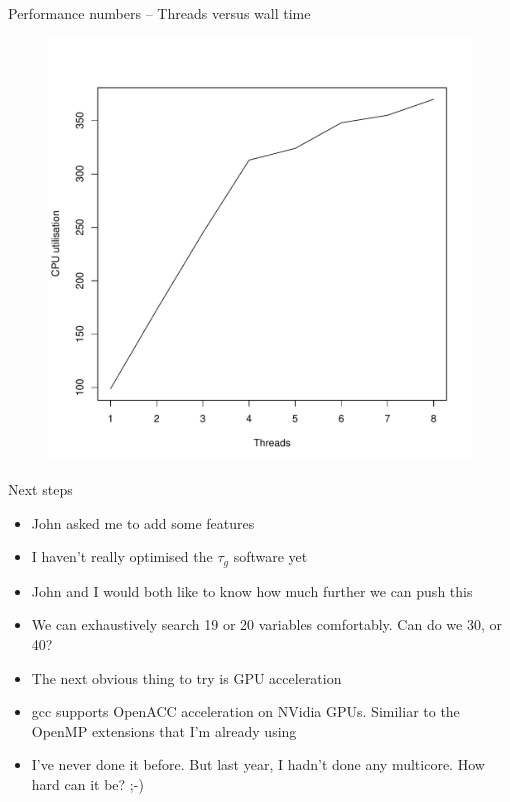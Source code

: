 \documentclass{beamer}
\begin{document}
\begin{frame}{Performance numbers -- Threads versus wall time}
\begin{figure}
\includegraphics[scale=0.45]{code/threads_versus_utilisation.pdf}
\end{figure}

\end{frame}

\begin{frame}{Next steps}
\begin{itemize}
\item John asked me to add some features
\item I haven't really optimised the $\tau_g$ software yet
\item John and I would both like to know how much further we can push this
\item We can exhaustively search 19 or 20 variables comfortably. Can do we 30, or 40?
\item The next obvious thing to try is GPU acceleration
\item gcc supports OpenACC acceleration on NVidia GPUs. Similiar to the OpenMP extensions
that I'm already using
\item I've never done it before. But last year, I hadn't done any multicore. How hard can it be? ;-)
\end{itemize}
\end{frame}
\end{document}
